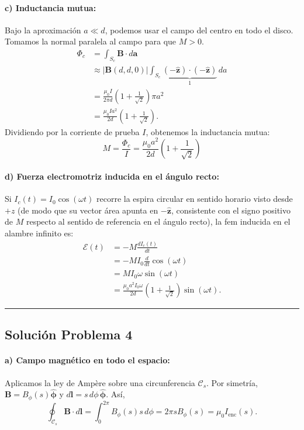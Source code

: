 \documentclass[11pt]{article}
\begin{document}
\paragraph{c) Inductancia mutua:}
Bajo la aproximación $a\ll d$, podemos usar el campo del centro
en todo el disco. Tomamos la normal paralela al campo para que $M>0$.
\begin{align*}
    \Phi_c
    &=\int_{S_c}\mathbf B\cdot d\mathbf a\\
    &\approx|\mathbf B(d,d,0)|
        \int_{S_c}\underbrace{
          (-\hat{\mathbf z})\cdot(-\hat{\mathbf z})}_{1}\,da\\
    &=\frac{\mu_0 I}{2\pi d}\left(1+\frac{1}{\sqrt{2}}\right)
         \pi a^2\\
    &=\frac{\mu_0 I a^2}{2d}\left(1+\frac{1}{\sqrt{2}}\right).
\end{align*}
Dividiendo por la corriente de prueba $I$, obtenemos la inductancia mutua:
\begin{equation}
    M = \frac{\Phi_c}{I} = \frac{\mu_0 a^2}{2d} \left( 1 + \frac{1}{\sqrt{2}} \right)
\end{equation}

\paragraph{d) Fuerza electromotriz inducida en el ángulo recto:}
Si $I_c(t) = I_0 \cos(\omega t)$ recorre la espira circular en sentido horario visto desde $+z$ (de modo que su vector área apunta en $-\hat{\mathbf{z}}$, consistente con el signo positivo de $M$ respecto al sentido de referencia en el ángulo recto), la fem inducida en el alambre infinito es:
\begin{align*}
    \mathcal E(t)
    &=-M\frac{d I_c(t)}{dt}\\
    &=-M I_0\frac{d}{dt}\cos(\omega t)\\
    &=M I_0\omega\sin(\omega t)\\
    &=\frac{\mu_0 a^2 I_0\omega}{2d}
      \left(1+\frac{1}{\sqrt{2}}\right)\sin(\omega t).
\end{align*}
\vspace{0.4cm}
\hrule
\vspace{0.5cm}

\subsection*{Solución Problema 4}

\paragraph{a) Campo magnético en todo el espacio:}
Aplicamos la ley de Ampère sobre una circunferencia $\mathcal C_s$.
Por simetría, $\mathbf B=B_\phi(s)\hat{\boldsymbol\phi}$ y
$d\mathbf l=s\,d\phi\,\hat{\boldsymbol\phi}$. Así,
\[
    \oint_{\mathcal C_s}\mathbf B\cdot d\mathbf l
    =\int_0^{2\pi}B_\phi(s)s\,d\phi
    =2\pi sB_\phi(s)=\mu_0 I_{\mathrm{enc}}(s).
\]
\end{document}
